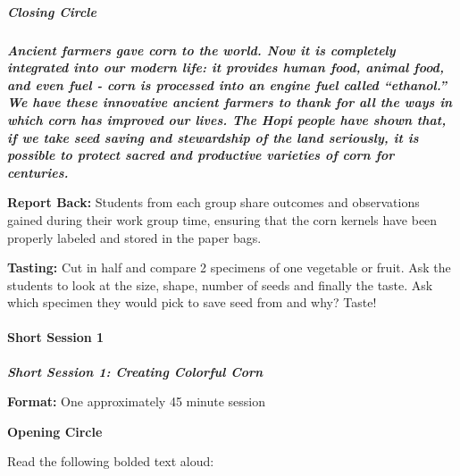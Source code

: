 \documentclass[12pt,]{article}
\let\oldparagraph\paragraph
\renewcommand{\paragraph}[1]{\oldparagraph{#1}\mbox{}}
\let\oldsubparagraph\subparagraph
\renewcommand{\subparagraph}[1]{\oldsubparagraph{#1}\mbox{}}
\begin{document}
\hypertarget{closing-circle-4}{%
\subparagraph{Closing Circle}\label{closing-circle-4}}

\textbf{\emph{Ancient farmers gave corn to the world. Now it is completely integrated into our modern life: it provides human food, animal food, and even fuel - corn is processed into an engine fuel called ``ethanol.'' We have these innovative ancient farmers to thank for all the ways in which corn has improved our lives. The Hopi people have shown that, if we take seed saving and stewardship of the land seriously, it is possible to protect sacred and productive varieties of corn for centuries.}}

\textbf{Report Back:} Students from each group share outcomes and observations gained during their work group time, ensuring that the corn kernels have been properly labeled and stored in the paper bags.

\textbf{Tasting:} Cut in half and compare 2 specimens of one vegetable or fruit. Ask the students to look at the size, shape, number of seeds and finally the taste. Ask which specimen they would pick to save seed from and why? Taste!

\hypertarget{short-session-1-3}{%
\paragraph{Short Session 1}\label{short-session-1-3}}

\textbf{\emph{Short Session 1: Creating Colorful Corn}}

\textbf{Format:} One approximately 45 minute session

\textbf{Opening Circle}

Read the following bolded text aloud:
\end{document}
